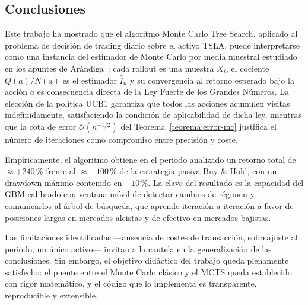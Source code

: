 \subsection{Conclusiones}
\label{subsec:conclusiones}

Este trabajo ha mostrado que el algoritmo Monte Carlo Tree Search, aplicado al problema de decisión de trading diario sobre el activo TSLA, puede interpretarse como una instancia del estimador de Monte Carlo por media muestral estudiado en los apuntes de Aràndiga~\cite{arandiga}: cada rollout es una muestra $X_i$, el cociente $Q(a)/N(a)$ es el estimador $\widehat{I}_n$ y su convergencia al retorno esperado bajo la acción $a$ es consecuencia directa de la Ley Fuerte de los Grandes Números. La elección de la política UCB1 garantiza que todos las acciones acumulen visitas indefinidamente, satisfaciendo la condición de aplicabilidad de dicha ley, mientras que la cota de error $\mathcal{O}(n^{-1/2})$ del Teorema~\ref{teorema:error-mc} justifica el número de iteraciones como compromiso entre precisión y coste.

Empíricamente, el algoritmo obtiene en el periodo analizado un retorno total de $\approx +240\,\%$ frente al $\approx +100\,\%$ de la estrategia pasiva Buy \& Hold, con un drawdown máximo contenido en $-10\,\%$. La clave del resultado es la capacidad del GBM calibrado con ventana móvil de detectar cambios de régimen y comunicarlos al árbol de búsqueda, que aprende iteración a iteración a favor de posiciones largas en mercados alcistas y de efectivo en mercados bajistas.

Las limitaciones identificadas ---ausencia de costes de transacción, sobreajuste al periodo, un único activo--- invitan a la cautela en la generalización de las conclusiones. Sin embargo, el objetivo didáctico del trabajo queda plenamente satisfecho: el puente entre el Monte Carlo clásico y el MCTS queda establecido con rigor matemático, y el código que lo implementa es transparente, reproducible y extensible.

